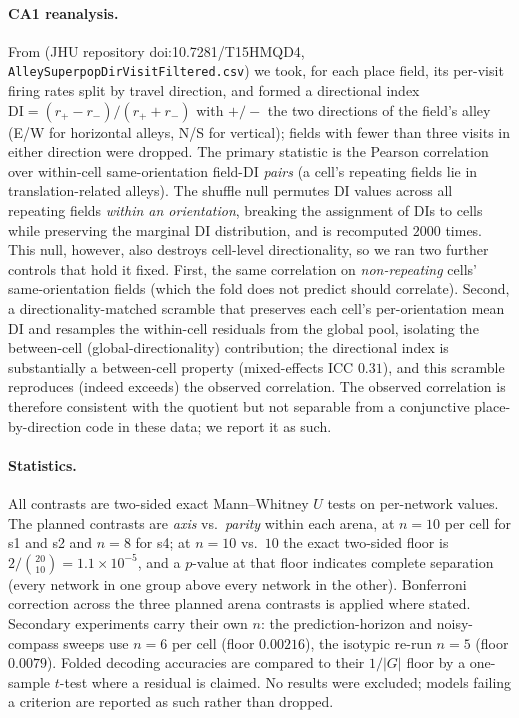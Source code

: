 \paragraph{CA1 reanalysis.} From \citet{hockeimer2023} (JHU repository doi:10.7281/T15HMQD4,
\texttt{AlleySuperpopDirVisitFiltered.csv}) we took, for each place field, its per-visit firing
rates split by travel direction, and formed a directional index $\mathrm{DI} = (r_+ - r_-)/(r_+ +
r_-)$ with $+/-$ the two directions of the field's alley (E/W for horizontal alleys, N/S for
vertical); fields with fewer than three visits in either direction were dropped. The primary
statistic is the Pearson correlation over within-cell same-orientation field-DI \emph{pairs}
(a cell's repeating fields lie in translation-related alleys). The shuffle null permutes DI values
across all repeating fields \emph{within an orientation}, breaking the assignment of DIs to cells
while preserving the marginal DI distribution, and is recomputed $2000$ times. This null, however,
also destroys cell-level directionality, so we ran two further controls that hold it fixed. First,
the same correlation on \emph{non-repeating} cells' same-orientation fields (which the fold does
not predict should correlate). Second, a directionality-matched scramble that preserves each cell's
per-orientation mean DI and resamples the within-cell residuals from the global pool, isolating the
between-cell (global-directionality) contribution; the directional index is substantially a
between-cell property (mixed-effects ICC $0.31$), and this scramble reproduces (indeed exceeds) the
observed correlation. The observed correlation is
therefore consistent with the quotient but not separable from a conjunctive place-by-direction code
in these data; we report it as such.

\paragraph{Statistics.} All contrasts are two-sided exact Mann--Whitney $U$ tests on per-network
values. The planned contrasts are \textit{axis} vs.\ \textit{parity} within each arena, at
$n = 10$ per cell for s1 and s2 and $n = 8$ for s4; at $n = 10$ vs.\ $10$ the exact two-sided
floor is $2/\binom{20}{10} = 1.1\times10^{-5}$, and a $p$-value at that floor indicates complete
separation (every network in one group above every network in the other). Bonferroni correction
across the three planned arena contrasts is applied where stated. Secondary experiments carry
their own $n$: the prediction-horizon and noisy-compass sweeps use $n = 6$ per cell (floor
$0.00216$), the isotypic re-run $n = 5$ (floor $0.0079$). Folded decoding accuracies are compared
to their $1/|G|$ floor by a one-sample $t$-test where a residual is claimed. No results were
excluded; models failing a criterion are reported as such rather than dropped.

